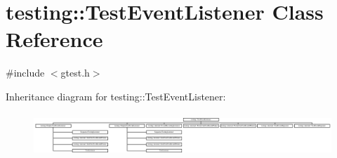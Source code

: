 \hypertarget{classtesting_1_1_test_event_listener}{\section{testing\-:\-:Test\-Event\-Listener Class Reference}
\label{classtesting_1_1_test_event_listener}
}


{\ttfamily \#include $<$gtest.\-h$>$}

Inheritance diagram for testing\-:\-:Test\-Event\-Listener\-:\begin{figure}[H]
\begin{center}
\leavevmode
\includegraphics[height=1.621622cm]{classtesting_1_1_test_event_listener}
\end{center}
\end{figure}
